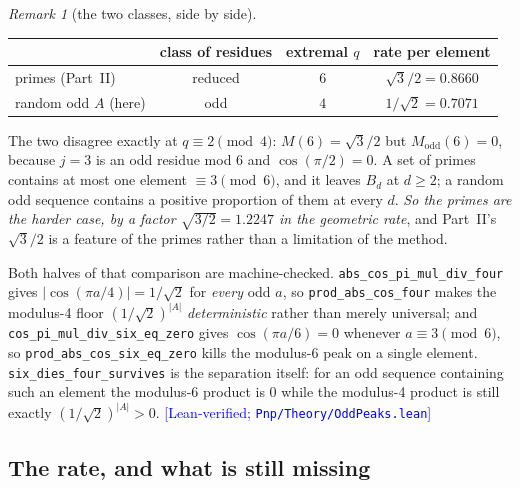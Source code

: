 \documentclass[11pt,a4paper]{article}
\theoremstyle{plain}
\theoremstyle{definition}
\theoremstyle{remark}
\newtheorem{remark}[theorem]{Remark}
\newcommand{\Lean}[1]{\texttt{#1}}
\newcommand{\STATUS}[1]{\textcolor{blue}{\textsf{[#1]}}}
\begin{document}
\begin{remark}[the two classes, side by side]\label{rem:twoclasses}
\begin{center}
\begin{tabular}{lccc}
\toprule
 & class of residues & extremal $q$ & rate per element\\
\midrule
primes (Part~II) & reduced & $6$ & $\sqrt3/2=0.8660$\\
random odd $A$ (here) & odd & $4$ & $1/\sqrt2=0.7071$\\
\bottomrule
\end{tabular}
\end{center}
\noindent
The two disagree exactly at $q\equiv2\pmod4$: $M(6)=\sqrt3/2$ but
$M_{\mathrm{odd}}(6)=0$, because $j=3$ is an odd residue mod $6$ and $\cos(\pi/2)=0$. A set
of primes contains at most one element $\equiv3\pmod 6$, and it leaves $B_d$ at $d\ge2$; a
random odd sequence contains a positive proportion of them at every $d$. \emph{So the primes
are the harder case, by a factor $\sqrt{3/2}=1.2247$ in the geometric rate}, and Part~II's
$\sqrt3/2$ is a feature of the primes rather than a limitation of the method.

Both halves of that comparison are machine-checked. \Lean{abs\_cos\_pi\_mul\_div\_four} gives
$|\cos(\pi a/4)|=1/\sqrt2$ for \emph{every} odd $a$, so \Lean{prod\_abs\_cos\_four} makes the
modulus-4 floor $(1/\sqrt2)^{|A|}$ \emph{deterministic} rather than merely universal; and
\Lean{cos\_pi\_mul\_div\_six\_eq\_zero} gives $\cos(\pi a/6)=0$ whenever $a\equiv3\pmod6$, so
\Lean{prod\_abs\_cos\_six\_eq\_zero} kills the modulus-6 peak on a single element.
\Lean{six\_dies\_four\_survives} is the separation itself: for an odd sequence containing such
an element the modulus-6 product is $0$ while the modulus-4 product is still exactly
$(1/\sqrt2)^{|A|}>0$.
\STATUS{Lean-verified; \texttt{Pnp/Theory/OddPeaks.lean}}
\end{remark}

\subsection{The rate, and what is still missing}\label{sec:rate}
\end{document}
